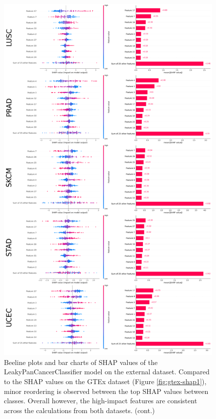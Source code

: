 \documentclass{l4proj}
\begin{document}
\begin{appendices}
\begin{figure}\ContinuedFloat
    \centering
    \includegraphics[width=0.85\linewidth]{images/ext_shap2.png}
    \caption{Beeline plots and bar charts of SHAP values of the LeakyPanCancerClassifier model on the external dataset. Compared to the SHAP values on the GTEx dataset (Figure \ref{fig:gtex-shap1}), minor reordering is observed between the top SHAP values between classes. Overall however, the high-impact features are consistent across the calculations from both datasets. (cont.)}
    \label{fig:ext-shap2}
\end{figure}


\end{appendices}
\end{document}
